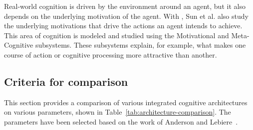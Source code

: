 Real-world cognition is driven by the environment around an agent, but
it also depends on the underlying motivation of the agent. With
\clarion, Sun et al. also study the underlying motivations that drive
the actions an agent intends to achieve. This area of cognition is
modeled and studied using the Motivational and Meta-Cognitive
subsystems.  These subsystems explain, for example, what makes one
course of action or cognitive processing more attractive than another.

\subsection{Criteria for comparison}
This section provides a comparison of various integrated cognitive
architectures on various parameters, shown in
Table~\ref{tab:architecture-comparison}. The parameters have been
selected based on the work of Anderson and
Lebiere~\cite{CambridgeJournals:207162}.

